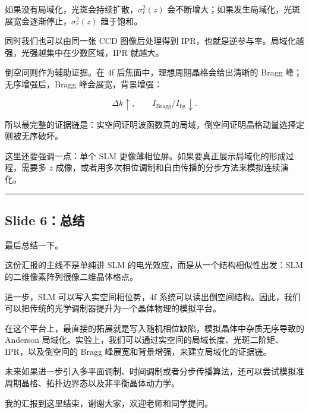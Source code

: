 \documentclass[UTF8,fontset=none,12pt]{ctexart}
\begin{document}
如果没有局域化，光斑会持续扩散，$\sigma_r^2(z)$ 会不断增大；如果发生局域化，光斑展宽会逐渐停止，$\sigma_r^2(z)$ 趋于饱和。\par

同时我们也可以由同一张 CCD 图像后处理得到 IPR，也就是逆参与率。局域化越强，光强越集中在少数区域，IPR 就越大。\par

倒空间则作为辅助证据。在 4f 后焦面中，理想周期晶格会给出清晰的 Bragg 峰；无序增强后，Bragg 峰会展宽，背景增强：\par

\[
\Delta k\uparrow,\qquad I_{\mathrm{Bragg}}/I_{\mathrm{bg}}\downarrow .
\]

所以最完整的证据链是：实空间证明波函数真的局域，倒空间证明晶格动量选择定则被无序破坏。\par

这里还要强调一点：单个 SLM 更像薄相位屏。如果要真正展示局域化的形成过程，需要多 $z$ 成像，或者用多次相位调制和自由传播的分步方法来模拟连续演化。\par

\bigskip\hrule\bigskip

\subsection*{Slide 6：总结}

最后总结一下。\par

这份汇报的主线不是单纯讲 SLM 的电光效应，而是从一个结构相似性出发：SLM 的二维像素阵列很像二维晶体格点。\par

进一步，SLM 可以写入实空间相位势，4f 系统可以读出倒空间结构。因此，我们可以把传统的光学调制器提升为一个晶体物理的模拟平台。\par

在这个平台上，最直接的拓展就是写入随机相位缺陷，模拟晶体中杂质无序导致的 Anderson 局域化。实验上，我们可以通过实空间的局域长度、光斑二阶矩、IPR，以及倒空间的 Bragg 峰展宽和背景增强，来建立局域化的证据链。\par

未来如果进一步引入多平面调制、时间调制或者分步传播算法，还可以尝试模拟准周期晶格、拓扑边界态以及非平衡晶体动力学。\par

我的汇报到这里结束，谢谢大家，欢迎老师和同学提问。\par
\end{document}
